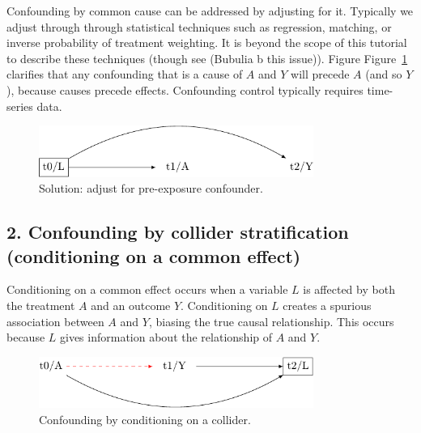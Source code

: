 \documentclass[
  singlecolumn]{report}
\begin{document}
Confounding by common cause can be addressed by adjusting for it.
Typically we adjust through through statistical techniques such as
regression, matching, or inverse probability of treatment weighting. It
is beyond the scope of this tutorial to describe these techniques
(though see (Bubulia b this issue)). Figure
Figure~\ref{fig-dag-common-cause-solution} clarifies that any
confounding that is a cause of \(A\) and \(Y\) will precede \(A\) (and
so \(Y\)), because causes precede effects. Confounding control typically
requires time-series data.

\begin{figure}

{\centering \includegraphics[width=0.8\textwidth,height=\textheight]{causal-dags_files/figure-pdf/fig-dag-common-cause-solution-1.pdf}

}

\caption{\label{fig-dag-common-cause-solution}Solution: adjust for
pre-exposure confounder.}

\end{figure}

\hypertarget{confounding-by-collider-stratification-conditioning-on-a-common-effect}{%
\subsection{2. Confounding by collider stratification (conditioning on a
common
effect)}\label{confounding-by-collider-stratification-conditioning-on-a-common-effect}}

Conditioning on a common effect occurs when a variable \(L\) is affected
by both the treatment \(A\) and an outcome \(Y\). Conditioning on \(L\)
creates a spurious association between \(A\) and \(Y\), biasing the true
causal relationship. This occurs because \(L\) gives information about
the relationship of \(A\) and \(Y\).

\begin{figure}

{\centering \includegraphics[width=0.8\textwidth,height=\textheight]{causal-dags_files/figure-pdf/fig-dag-common-effect-1.pdf}

}

\caption{\label{fig-dag-common-effect}Confounding by conditioning on a
collider.}

\end{figure}
\end{document}

